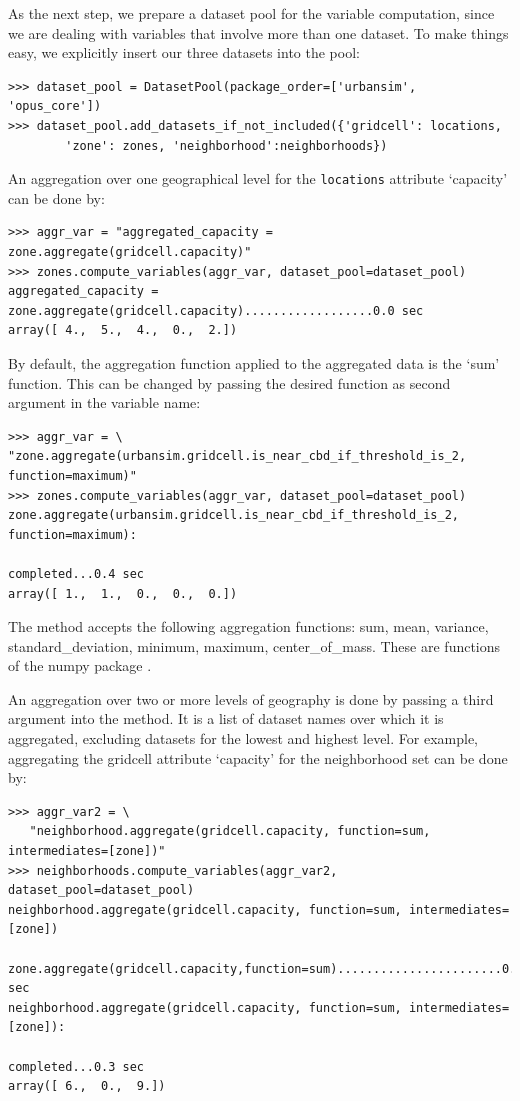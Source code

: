 As the next step, we prepare a dataset pool  for the variable computation, since we are dealing with variables
that involve more than one dataset. To make things easy, we explicitly insert
our three datasets into the pool:
\begin{verbatim}
>>> dataset_pool = DatasetPool(package_order=['urbansim', 'opus_core'])
>>> dataset_pool.add_datasets_if_not_included({'gridcell': locations,
        'zone': zones, 'neighborhood':neighborhoods})
\end{verbatim}
An aggregation over one geographical level for the \verb|locations|
attribute \attributesindex `capacity' can be done by: \variablesindex
\attributesindex
\begin{verbatim}
>>> aggr_var = "aggregated_capacity = zone.aggregate(gridcell.capacity)"
>>> zones.compute_variables(aggr_var, dataset_pool=dataset_pool)
aggregated_capacity = zone.aggregate(gridcell.capacity)..................0.0 sec
array([ 4.,  5.,  4.,  0.,  2.])
\end{verbatim}
By default, the aggregation function applied to the aggregated data is the
`sum' function. This can be changed by passing the desired function as second
argument in the variable \variablesindex name: \variablesindex
\begin{verbatim}
>>> aggr_var = \
"zone.aggregate(urbansim.gridcell.is_near_cbd_if_threshold_is_2, function=maximum)"
>>> zones.compute_variables(aggr_var, dataset_pool=dataset_pool)
zone.aggregate(urbansim.gridcell.is_near_cbd_if_threshold_is_2, function=maximum):
                                                            completed...0.4 sec
array([ 1.,  1.,  0.,  0.,  0.])
\end{verbatim}

The  method accepts the following aggregation functions:
sum, mean, variance, standard_deviation, minimum, maximum,
center_of_mass. These are functions of the numpy package
.

An aggregation over two or more levels of geography is done by passing a
third argument into the \class{aggregate} method. It is a list of dataset
\datasetindex names over which it is aggregated, excluding datasets
\datasetindex for the lowest and highest level. For example, aggregating
the gridcell attribute \attributesindex `capacity' for the neighborhood set
can be done by: \variablesindex \attributesindex
\begin{verbatim}
>>> aggr_var2 = \
   "neighborhood.aggregate(gridcell.capacity, function=sum, intermediates=[zone])"
>>> neighborhoods.compute_variables(aggr_var2, dataset_pool=dataset_pool)
neighborhood.aggregate(gridcell.capacity, function=sum, intermediates=[zone])
    zone.aggregate(gridcell.capacity,function=sum).......................0.0 sec
neighborhood.aggregate(gridcell.capacity, function=sum, intermediates=[zone]):
                                                            completed...0.3 sec
array([ 6.,  0.,  9.])
\end{verbatim}

